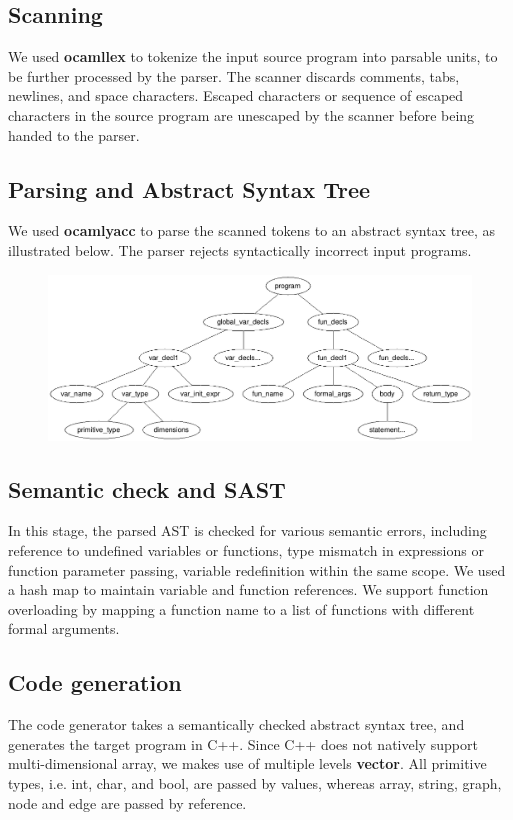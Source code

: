 \documentclass[a4paper,12pt]{article}
\begin{document}
\subsection{Scanning}
We used \textbf{ocamllex} to tokenize the input source program into parsable units, to be further processed by the parser.  The scanner discards comments, tabs, newlines, and space characters.  Escaped characters or sequence of escaped characters in the source program are unescaped by the scanner before being handed to the parser.

\subsection{Parsing and Abstract Syntax Tree}
We used \textbf{ocamlyacc} to parse the scanned tokens to an abstract syntax tree, as illustrated below.  The parser rejects syntactically incorrect input programs.

\begin{figure}[h]
	\centering
	\includegraphics[scale=0.35]{ast.png}
\end{figure}

\subsection{Semantic check and SAST}
In this stage, the parsed AST is checked for various semantic errors, including reference to undefined variables or functions, type mismatch in expressions or function parameter passing, variable redefinition within the same scope.  We used a hash map to maintain variable and function references. We support function overloading by mapping a function name to a list of functions with different formal arguments.

\subsection{Code generation}
The code generator takes a semantically checked abstract syntax tree, and generates the target program in C++. Since C++ does not natively support multi-dimensional array, we makes use of multiple levels \textbf{vector}. All primitive types, i.e. int, char, and bool, are passed by values, whereas array, string, graph, node and edge are passed by reference.
\end{document}

